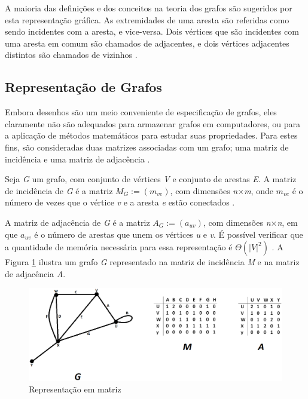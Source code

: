 A maioria das definições e dos conceitos na teoria dos grafos são sugeridos por esta representação gráfica. As extremidades de uma aresta são referidas como sendo incidentes com a aresta, e vice-versa. Dois vértices que são incidentes com uma aresta em comum são chamados de adjacentes, e dois vértices adjacentes distintos são chamados de vizinhos \cite{Costa:2011}.

\subsection{Representação de Grafos}

Embora desenhos são um meio conveniente de especificação de grafos, eles claramente não são adequados para armazenar grafos em computadores, ou para a aplicação de métodos matemáticos para estudar suas propriedades. Para estes fins, são consideradas duas matrizes associadas com um grafo; uma matriz de incidência e uma matriz de adjacência \cite{Bondy:2007}.

Seja \textit{G} um grafo, com conjunto de vértices \textit{V} e conjunto de arestas \textit{E}. A matriz de incidência de \textit{G} é a matriz $M_G:= (m_{ve})$, com dimensões \textit{n$\times$m}, onde $m_{ve}$ é o número de vezes que o vértice \textit{v} e a aresta \textit{e} estão conectados \cite{Bondy:2007}.

A matriz de adjacência de \textit{G} é a matriz $A_G := (a_{uv})$, com dimensões \textit{n$\times$n}, em que $a_{uv}$ é o número de arestas que unem os vértices \textit{u} e \textit{v}. É possível verificar que a quantidade de memória necessária para essa representação é $\Theta(|\textit{V}|^2)$ \cite{Bondy:2007}. A Figura \ref{matriz} ilustra um grafo \textit{G} representado na matriz de incidência \textit{M} e na matriz de adjacência \textit{A}.

\begin{figure}[!h]
	\centering
	\includegraphics[scale=0.45]{figuras/referencial_teorico/matriz.eps}
	\caption[Representação em matriz]{Representação em matriz \cite{Bondy:2007}}
	\label{matriz}
\end{figure}

